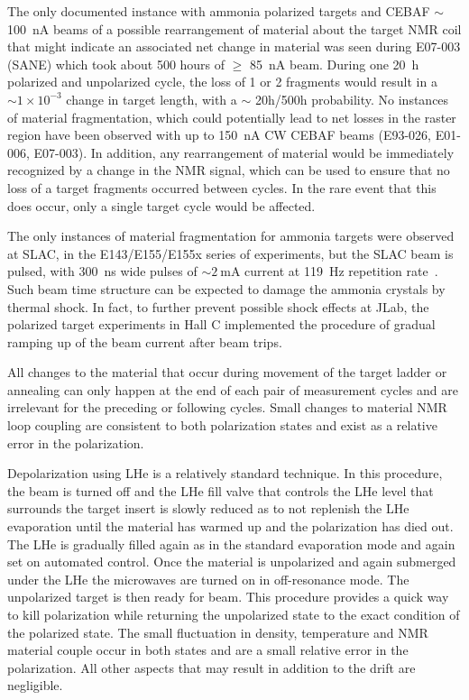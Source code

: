 The only documented instance with ammonia polarized targets and CEBAF $\sim$100~nA beams of a possible rearrangement of material about the target NMR coil that
might indicate an associated net change in material was seen during E07-003 (SANE) which took about 500 hours of $\ge$ 85~nA beam. 
During one 20~h polarized and unpolarized cycle, the loss of 1 or 2 fragments would result in a $\sim 1\times 10^{-3}$  change in target length, with a $\sim$ 20h/500h probability.
No instances of material fragmentation, which could potentially lead to net 
losses in the raster region have been observed with up to 150~nA CW CEBAF beams 
(E93-026, E01-006, E07-003).  In addition, any rearrangement of material would be immediately recognized by a change in the NMR signal, which can be
used to ensure that no loss of a target fragments occurred between cycles. In the rare event that this does occur, only a single target cycle would be affected.

The only instances of material fragmentation for ammonia targets were observed 
at SLAC, in the E143/E155/E155x series of experiments, but the SLAC beam is 
pulsed, with 300~ns wide pulses of $\sim2~$mA current at 119~Hz repetition
rate~\cite{TOBIASTHESIS}. Such beam time structure can be expected to damage the ammonia crystals by
thermal shock. In fact, to further prevent possible shock effects at JLab, the 
polarized target experiments in Hall C implemented the procedure of gradual
ramping up of the beam current after beam trips.

All changes to the material that occur during movement of the target ladder or
annealing can only happen at the end of each pair of measurement cycles and are
irrelevant for the preceding or following cycles.  Small changes to material
NMR loop coupling are consistent to both polarization states and exist as
a relative error in the polarization.

Depolarization using LHe is a relatively standard technique.  In this procedure, the
beam is turned off and the LHe fill valve that controls the
LHe level that surrounds the target insert is slowly reduced as to not replenish
the LHe evaporation until the material has warmed up and the polarization has died out.
The LHe is gradually filled again as in the standard evaporation mode and again set on
automated control.  Once the material is unpolarized and again submerged under
the LHe the microwaves are turned on in off-resonance mode.  The unpolarized target
is then ready for beam.  This procedure provides a quick way to kill polarization while
returning the unpolarized state to the exact condition of the polarized state.  The
small fluctuation in density, temperature and NMR material couple occur in both states
and are a small relative error in the polarization.  All other aspects that may result
in addition to the drift are negligible. 

